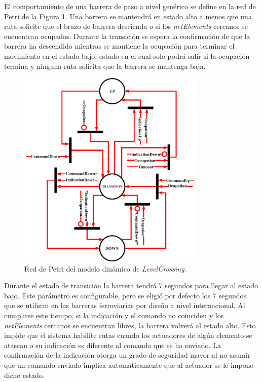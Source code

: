 	El comportamiento de una barrera de paso a nivel genérico se define en la red de Petri de la Figura \ref{fig:LCB_Petri}. Una barrera se mantendrá en estado alto a menos que una ruta solicite que el brazo de barrera descienda o si los \textit{netElements} cercanos se encuentran ocupados. Durante la transición se espera la confirmación de que la barrera ha descendido mientras se mantiene la ocupación para terminar el movimiento en el estado bajo, estado en el cual solo podrá salir si la ocupación termina y ninguna ruta solicita que la barrera se mantenga baja.
	
	\begin{figure}[H]
		\centering
		\includegraphics[width=0.8\textwidth]{Figuras/LCB_petri}
		\centering\caption{Red de Petri del modelo dinámico de \textit{LevelCrossing}.}
		\label{fig:LCB_Petri}
	\end{figure}
	
	Durante el estado de transición la barrera tendrá 7 segundos para llegar al estado bajo. Este parámetro es configurable, pero se eligió por defecto los 7 segundos que se utilizan en las barreras ferroviarias por diseño a nivel internacional\cite{UK}. Al cumplirse este tiempo, si la indicación y el comando no coinciden y los \textit{netElements} cercanos se encuentran libres, la barrera volverá al estado alto. Esto impide que el sistema habilite rutas cuando los actuadores de algún elemento se atascan o su indicación es diferente al comando que se ha enviado. La confirmación de la indicación otorga un grado de seguridad mayor al no asumir que un comando enviado implica automáticamente que al actuador se le impone dicho estado.